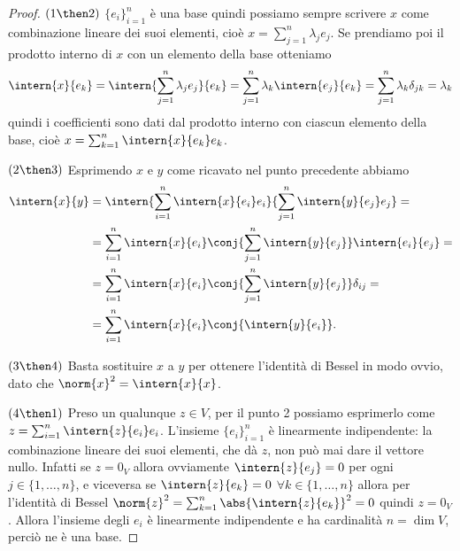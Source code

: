 \begin{proof}
	$(1\then 2)$ $\{  e_i\}_{i=1}^n$ è una base quindi possiamo sempre scrivere $  x$ come combinazione lineare dei suoi elementi, cioè $  x=\sum_{j=1}^n\lambda_j  e_j$.
	Se prendiamo poi il prodotto interno di $  x$ con un elemento della base otteniamo
	\begin{equation}
		\intern{  x}{  e_k}=\intern{\sum_{j=1}^n\lambda_j  e_j}{  e_k}=\sum_{j=1}^n\lambda_k\intern{  e_j}{  e_k}=\sum_{j=1}^n\lambda_k\delta_{jk}=\lambda_k
	\end{equation}
	quindi i coefficienti sono dati dal prodotto interno con ciascun elemento della base, cioè $  x=\sum_{k=1}^n\intern{  x}{  e_k}  e_k$.

	$(2\then 3)$ Esprimendo $  x$ e $  y$ come ricavato nel punto precedente abbiamo
	\begin{equation}
		\begin{split}
			\intern{  x}{  y}&=\intern{\sum_{i=1}^n\intern{  x}{  e_i}  e_i}{\sum_{j=1}^n\intern{  y}{  e_j}  e_j}=\\
			&=\sum_{i=1}^n\intern{  x}{  e_i}\conj{\sum_{j=1}^n\intern{  y}{  e_j}}\intern{  e_i}{  e_j}=\\
			&=\sum_{i=1}^n\intern{  x}{  e_i}\conj{\sum_{j=1}^n\intern{  y}{  e_j}}\delta_{ij}=\\
			&=\sum_{i=1}^n\intern{  x}{  e_i}\conj{\intern{  y}{  e_i}}.
		\end{split}
	\end{equation}
	
	$(3\then 4)$ Basta sostituire $  x$ a $  y$ per ottenere l'identità di Bessel in modo ovvio, dato che $\norm{  x}^2=\intern{  x}{  x}$.

	$(4\then 1)$ Preso un qualunque $  z\in V$, per il punto 2 possiamo esprimerlo come $  z=\sum_{i=1}^n\intern{  z}{  e_i}  e_i$.
	L'insieme $\{  e_i\}_{i=1}^n$ è linearmente indipendente: la combinazione lineare dei suoi elementi, che dà $  z$, non può mai dare il vettore nullo.
	Infatti se $  z=0_V$ allora ovviamente $\intern{  z}{  e_j}=0$ per ogni $j\in\{1,\dots,n\}$, e viceversa se $\intern{  z}{  e_k}=0$ $\forall k\in\{1,\dots,n\}$ allora per l'identità di Bessel $\norm{  z}^2=\sum_{k=1}^n\abs{\intern{  z}{  e_k}}^2=0$ quindi $  z=0_V$.
	Allora l'insieme degli $  e_i$ è linearmente indipendente e ha cardinalità $n=\dim V$, perciò ne è una base.
\end{proof}

